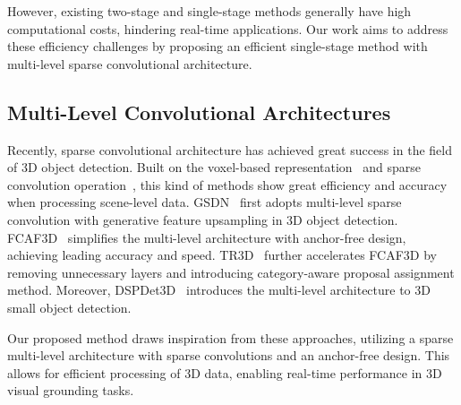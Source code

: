 However, existing two-stage and single-stage methods generally have high computational costs, hindering real-time applications. Our work aims to address these efficiency challenges by proposing an efficient single-stage method with multi-level sparse convolutional architecture.

\subsection{Multi-Level Convolutional Architectures}
Recently, sparse convolutional architecture has achieved great success in the field of 3D object detection. Built on the voxel-based representation~\citep{wang2022cagroup3d,chen2023voxelnext,deng2021voxel} and sparse convolution operation~\citep{choy20194d,graham20183d,xu2023binarizing}, this kind of methods show great efficiency and accuracy when processing scene-level data. GSDN~\citep{gwak2020generative} first adopts multi-level sparse convolution with generative feature upsampling in 3D object detection. FCAF3D~\citep{rukhovich2022fcaf3d} simplifies the multi-level architecture with anchor-free design, achieving leading accuracy and speed. TR3D~\citep{rukhovich2023tr3d} further accelerates FCAF3D by removing unnecessary layers and introducing category-aware proposal assignment method. Moreover, DSPDet3D~\cite{xu2023dsp} introduces the multi-level architecture to 3D small object detection.

Our proposed method draws inspiration from these approaches, utilizing a sparse multi-level architecture with sparse convolutions and an anchor-free design. This allows for efficient processing of 3D data, enabling real-time performance in 3D visual grounding tasks.


